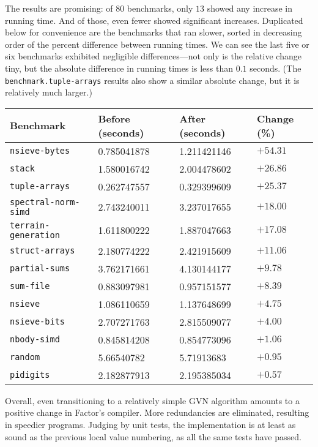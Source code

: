 The results are promising: of $80$ benchmarks, only $13$ showed any increase in
running time.  And of those, even fewer showed significant increases.
Duplicated below for convenience are the benchmarks that ran slower, sorted in
decreasing order of the percent difference between running times.  We can see
the last five or six benchmarks exhibited negligible differences---not only is
the relative change tiny, but the absolute difference in running times is less
than $0.1$ seconds.  (The \Verb|benchmark.tuple-arrays| results also show a
similar absolute change, but it is relatively much larger.)

\begin{longtable}{llll}
\toprule
Benchmark & Before (seconds) & After (seconds) & Change (\%) \\
\midrule
\endhead
\texttt{nsieve-bytes}             & 0.785041878       & 1.211421146         & $+54.31$    \\
\texttt{stack}                    & 1.580016742       & 2.004478602         & $+26.86$    \\
\texttt{tuple-arrays}             & 0.262747557       & 0.329399609         & $+25.37$    \\
\texttt{spectral-norm-simd}       & 2.743240011       & 3.237017655         & $+18.00$    \\
\texttt{terrain-generation}       & 1.611800222       & 1.887047663         & $+17.08$    \\
\texttt{struct-arrays}            & 2.180774222       & 2.421915609         & $+11.06$    \\
\texttt{partial-sums}             & 3.762171661       & 4.130144177         & $+9.78$     \\
\texttt{sum-file}                 & 0.883097981       & 0.957151577         & $+8.39$     \\
\texttt{nsieve}                   & 1.086110659       & 1.137648699         & $+4.75$     \\
\texttt{nsieve-bits}              & 2.707271763       & 2.815509077         & $+4.00$     \\
\texttt{nbody-simd}               & 0.845814208       & 0.854773096         & $+1.06$     \\
\texttt{random}                   & 5.66540782        & 5.71913683          & $+0.95$     \\
\texttt{pidigits}                 & 2.182877913       & 2.195385034         & $+0.57$     \\
\end{longtable}

Overall, even transitioning to a relatively simple \gls{GVN} algorithm amounts
to a positive change in Factor's compiler.  More redundancies are eliminated,
resulting in speedier programs.  Judging by unit tests, the implementation is
at least as sound as the previous local value numbering,  as all the same tests
have passed.
